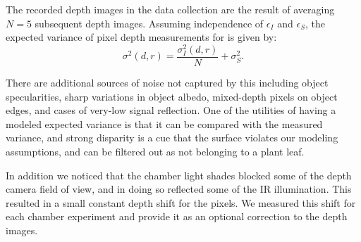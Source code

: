 The recorded depth images in the data collection are the result of averaging $N=5$ subsequent depth images.  Assuming independence of $\epsilon_I$ and $\epsilon_S$, the expected variance of pixel depth measurements for is given by:
\begin{equation}
\sigma^2(d,r) = \frac{\sigma_I^2(d,r)}{N} + \sigma_S^2.\label{eq:sigma}
\end{equation}

There are additional sources of noise not captured by this including object specularities, sharp variations in object albedo, mixed-depth pixels on object edges, and cases of very-low signal reflection. One of the utilities of having a modeled expected variance is that it can be compared with the measured variance, and strong disparity is a cue that the surface violates our modeling assumptions, and can be filtered out as not belonging to a plant leaf. 

In addition we noticed that the chamber light shades blocked some of the depth camera field of view, and in doing so reflected some of the IR illumination. This resulted in a small constant depth shift for the pixels. We measured this shift for each chamber experiment and provide it as an optional correction to the depth images.






